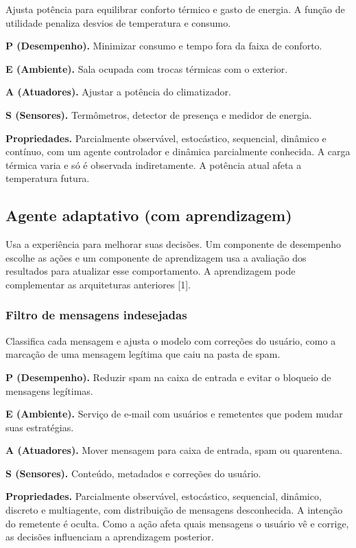 \documentclass[12pt,a4paper]{article}
\begin{document}
Ajusta potência para equilibrar conforto térmico e gasto de energia. A função de utilidade penaliza desvios de temperatura e consumo.

\textbf{P (Desempenho).} Minimizar consumo e tempo fora da faixa de conforto.

\textbf{E (Ambiente).} Sala ocupada com trocas térmicas com o exterior.

\textbf{A (Atuadores).} Ajustar a potência do climatizador.

\textbf{S (Sensores).} Termômetros, detector de presença e medidor de energia.

\textbf{Propriedades.} Parcialmente observável, estocástico, sequencial, dinâmico e contínuo, com um agente controlador e dinâmica parcialmente conhecida. A carga térmica varia e só é observada indiretamente. A potência atual afeta a temperatura futura.

\subsection{Agente adaptativo (com aprendizagem)}

Usa a experiência para melhorar suas decisões. Um componente de desempenho escolhe as ações e um componente de aprendizagem usa a avaliação dos resultados para atualizar esse comportamento. A aprendizagem pode complementar as arquiteturas anteriores [1].

\subsubsection{Filtro de mensagens indesejadas}

Classifica cada mensagem e ajusta o modelo com correções do usuário, como a marcação de uma mensagem legítima que caiu na pasta de spam.

\textbf{P (Desempenho).} Reduzir spam na caixa de entrada e evitar o bloqueio de mensagens legítimas.

\textbf{E (Ambiente).} Serviço de e-mail com usuários e remetentes que podem mudar suas estratégias.

\textbf{A (Atuadores).} Mover mensagem para caixa de entrada, spam ou quarentena.

\textbf{S (Sensores).} Conteúdo, metadados e correções do usuário.

\textbf{Propriedades.} Parcialmente observável, estocástico, sequencial, dinâmico, discreto e multiagente, com distribuição de mensagens desconhecida. A intenção do remetente é oculta. Como a ação afeta quais mensagens o usuário vê e corrige, as decisões influenciam a aprendizagem posterior.
\end{document}
